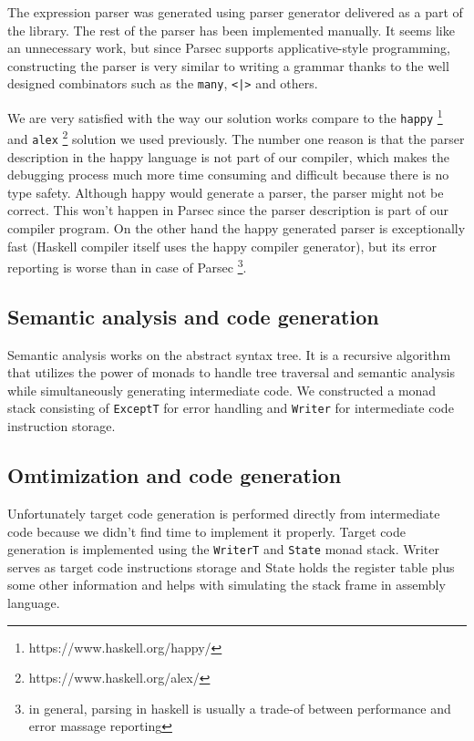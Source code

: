 \documentclass[titlepage]{article}
\begin{document}
The expression parser was generated using parser generator delivered as a part of the
library. The rest of the parser has been implemented manually. It seems like an 
unnecessary work, but since Parsec supports applicative-style programming, 
constructing the parser is very similar to writing a grammar thanks to the well 
designed combinators such as the \texttt{many}, \texttt{<|>} and others.

We are very satisfied with the way our solution works compare to the \texttt{happy}
\footnote{https://www.haskell.org/happy/} \cite{happy} and \texttt{alex} 
\footnote{https://www.haskell.org/alex/} solution we used previously. The number one
reason is that the parser description in the happy language is not part of our 
compiler, which makes the debugging process much more time consuming and difficult
because there is no type safety. Although happy would generate a parser, the parser
might not be correct. This won't happen in Parsec since the parser description is 
part of our compiler program.
On the other hand the happy generated parser is exceptionally fast (Haskell compiler 
itself uses the happy compiler generator), but its error reporting is worse than in
case of Parsec \footnote{in general, parsing in haskell is usually a trade-of between performance
and error massage reporting}.

\subsection{Semantic analysis and code generation}
Semantic analysis works on the abstract syntax tree. It is a recursive algorithm that
utilizes the power of monads to handle tree traversal and semantic analysis while
simultaneously generating intermediate code. We constructed a monad stack consisting of
\texttt{ExceptT} for error handling and \texttt{Writer} for intermediate code instruction
storage. 

\subsection{Omtimization and code generation}
Unfortunately target code generation is performed directly from intermediate code because
we didn't find time to implement it properly. Target code generation is implemented 
using the \texttt{WriterT} and \texttt{State} monad stack. Writer serves as target code 
instructions storage and State holds the register table plus some other information and 
helps with simulating the stack frame in assembly language. 
\end{document}
